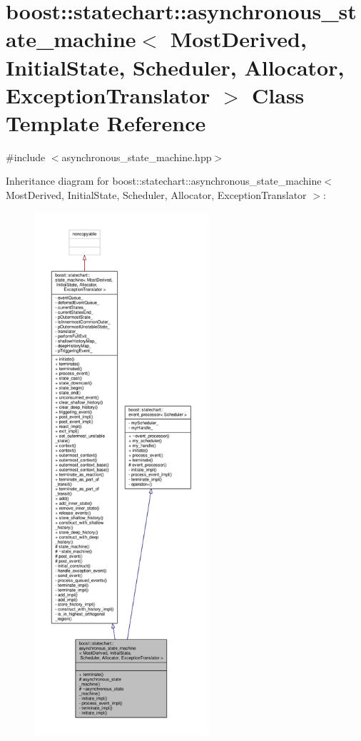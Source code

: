 \hypertarget{classboost_1_1statechart_1_1asynchronous__state__machine}{}\section{boost\+:\+:statechart\+:\+:asynchronous\+\_\+state\+\_\+machine$<$ Most\+Derived, Initial\+State, Scheduler, Allocator, Exception\+Translator $>$ Class Template Reference}
\label{classboost_1_1statechart_1_1asynchronous__state__machine}


{\ttfamily \#include $<$asynchronous\+\_\+state\+\_\+machine.\+hpp$>$}



Inheritance diagram for boost\+:\+:statechart\+:\+:asynchronous\+\_\+state\+\_\+machine$<$ Most\+Derived, Initial\+State, Scheduler, Allocator, Exception\+Translator $>$\+:
\nopagebreak
\begin{figure}[H]
\begin{center}
\leavevmode
\includegraphics[height=550pt]{classboost_1_1statechart_1_1asynchronous__state__machine__inherit__graph}
\end{center}
\end{figure}



